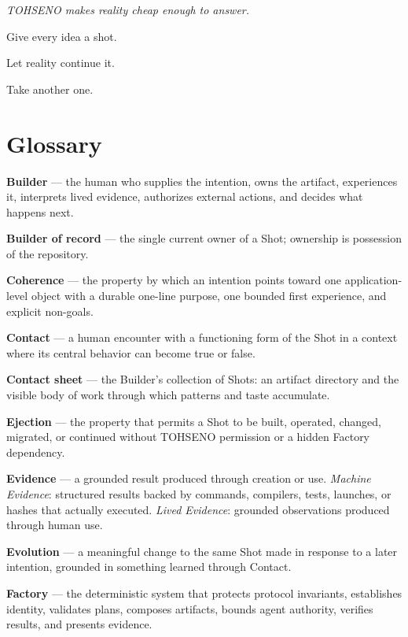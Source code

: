 \documentclass[11pt]{article}
\newenvironment{creed}
  {\begin{center}\begin{minipage}{0.86\textwidth}\itshape\large\centering}
  {\end{minipage}\end{center}\vspace{0.4em}}
\newcommand{\TOH}{TOHSENO}
\begin{document}
\begin{creed}
\TOH{} makes reality cheap enough to answer.
\end{creed}

Give every idea a shot.

Let reality continue it.

Take another one.

\clearpage
\section*{Glossary}

\textbf{Builder} --- the human who supplies the intention, owns the
artifact, experiences it, interprets lived evidence, authorizes external
actions, and decides what happens next.

\textbf{Builder of record} --- the single current owner of a Shot;
ownership is possession of the repository.

\textbf{Coherence} --- the property by which an intention points toward
one application-level object with a durable one-line purpose, one
bounded first experience, and explicit non-goals.

\textbf{Contact} --- a human encounter with a functioning form of the
Shot in a context where its central behavior can become true or false.

\textbf{Contact sheet} --- the Builder's collection of Shots: an
artifact directory and the visible body of work through which patterns
and taste accumulate.

\textbf{Ejection} --- the property that permits a Shot to be built,
operated, changed, migrated, or continued without \TOH{} permission or a
hidden Factory dependency.

\textbf{Evidence} --- a grounded result produced through creation or
use. \emph{Machine Evidence}: structured results backed by commands,
compilers, tests, launches, or hashes that actually executed.
\emph{Lived Evidence}: grounded observations produced through human use.

\textbf{Evolution} --- a meaningful change to the same Shot made in
response to a later intention, grounded in something learned through
Contact.

\textbf{Factory} --- the deterministic system that protects protocol
invariants, establishes identity, validates plans, composes artifacts,
bounds agent authority, verifies results, and presents evidence.
\end{document}
